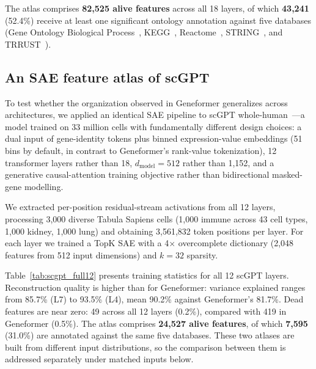 \documentclass[onecolumn,11pt]{article}
\begin{document}
The atlas comprises \textbf{82,525 alive features} across all 18 layers, of which \textbf{43,241}
(52.4\%) receive at least one significant ontology annotation against five databases (Gene Ontology
Biological Process~\cite{ashburner2000go}, KEGG~\cite{kanehisa2000kegg},
Reactome~\cite{jassal2020reactome}, STRING~\cite{szklarczyk2023string}, and
TRRUST~\cite{han2018trrust}).

\subsection*{An SAE feature atlas of scGPT}
\label{sec:scgpt_atlas}

To test whether the organization observed in Geneformer generalizes across architectures, we
applied an identical SAE pipeline to scGPT whole-human~\cite{cui2024scgpt}---a model trained on 33
million cells with fundamentally different design choices: a dual input of gene-identity tokens plus
binned expression-value embeddings (51 bins by default, in contrast to Geneformer's rank-value
tokenization), 12 transformer layers rather than 18, $d_\text{model}{=}512$ rather than 1,152, and a
generative causal-attention training objective rather than bidirectional masked-gene modelling.

We extracted per-position residual-stream activations from all 12 layers, processing 3,000 diverse
Tabula Sapiens cells (1,000 immune across 43 cell types, 1,000 kidney, 1,000 lung) and obtaining
3,561,832 token positions per layer. For each layer we trained a TopK SAE with a 4$\times$
overcomplete dictionary (2,048 features from 512 input dimensions) and $k{=}32$ sparsity.

Table~\ref{tab:scgpt_full12} presents training statistics for all 12 scGPT layers. Reconstruction
quality is higher than for Geneformer: variance explained ranges from 85.7\% (L7) to 93.5\% (L4),
mean 90.2\% against Geneformer's 81.7\%. Dead features are near zero: 49 across all 12 layers
(0.2\%), compared with 419 in Geneformer (0.5\%). The atlas comprises \textbf{24,527 alive
features}, of which \textbf{7,595} (31.0\%) are annotated against the same five databases. These
two atlases are built from different input distributions, so the comparison between them is
addressed separately under matched inputs below.
\end{document}
